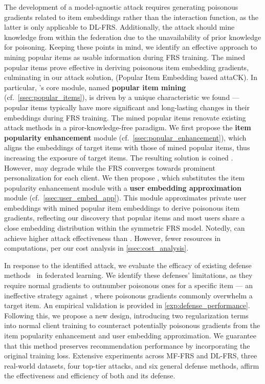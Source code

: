 The development of a model-agnostic attack requires generating poisonous gradients related to item embeddings rather than the interaction function, as the latter is only applicable to DL-FRS. Additionally, the attack should mine knowledge from within the federation due to the unavailability of prior knowledge for poisoning. 
Keeping these points in mind, we identify an effective approach to mining popular items as usable information during FRS training. The mined popular items prove effective in deriving poisonous item embedding gradients, culminating in our attack solution, \model{} (Popular Item Embedding based attaCK).
In particular, \model{}'s core module, named \textbf{popular item mining} (cf.\ \cref{ssec:popular_items}), is driven by a unique characteristic we found --- popular items typically have more significant and long-lasting changes in their embeddings during FRS training.
The mined popular items renovate existing attack methods in a piror-knowledge-free paradigm.
%
We first propose the \textbf{item popularity enhancement} module (cf.\ \cref{ssec:popular_enhancement}), which aligns the embeddings of target items with those of mined popular items, thus increasing the exposure of target items. The resulting solution is coined \modelI{}.
However, \modelI{} may degrade while the FRS converges towards prominent personalization for each client.
We then propose \modelII{}, which substitutes the item popularity enhancement module with a \textbf{user embedding approximation} module (cf.\ \cref{ssec:user_embed_app}). This module approximates private user embeddings with mined popular item embeddings to derive poisonous item gradients, reflecting our discovery that popular items and most users share a close embedding distribution within the symmetric FRS model.
Notedly, \modelII{} can achieve higher attack effectiveness than \modelI{}. 
However, \modelI{} fewer resources in computations, per our cost analysis in \cref{ssec:cost_analysis}.

In response to the identified attack, we evaluate the efficacy of existing defense methods~\cite{NormBound,Media-TrimmedMean,Krum-MultiKrum,Bulyan} in federated learning. We identify these defenses' limitations, as they require normal gradients to outnumber poisonous ones for a specific item --- an ineffective strategy against \model{}, where poisonous gradients commonly overwhelm a target item. An empirical validation is provided in \cref{exp:defense_performance}.
Following this, we propose a new design, introducing two regularization terms into normal client training to counteract potentially poisonous gradients from the item popularity enhancement and user embedding approximation. We guarantee that this method preserves recommendation performance by incorporating the original training loss.
Extensive experiments across MF-FRS and DL-FRS, three real-world datasets, four top-tier attacks, and six general defense methods, affirm the effectiveness and efficiency of both \model{} and its defense.

